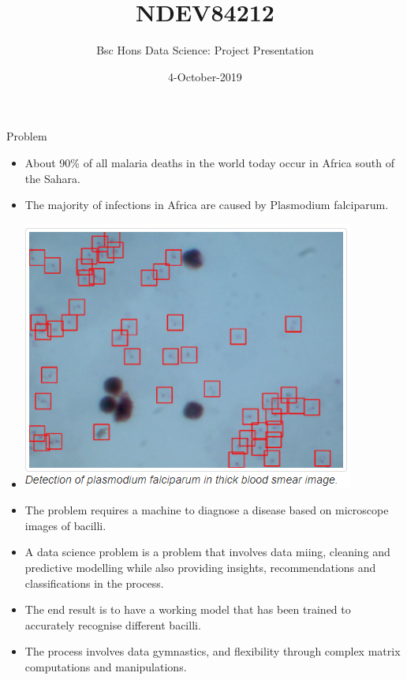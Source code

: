 \documentclass{beamer}
\title[Project Presentation]{NDEV84212}
\author[Olatomiwa Akinlaja]{Bsc Hons Data Science: Project Presentation}
\institute[SPU]{\textbf{\large Olatomiwa O. Akinlaja}}
\date{4-October-2019}
\begin{document}
\frame{\titlepage}
\begin{frame}[t]{Problem}
\vspace{1pt}\small

	\begin{itemize}
	\item About 90\% of all malaria deaths in the world today occur in Africa south of the Sahara.
	\item The majority of infections in Africa are caused by Plasmodium falciparum. 
	\item \includegraphics[scale = 0.5]{DP.png} 
	\end{itemize}

	
\end{frame}

\begin{frame}
	\begin{block}{\color{red}{Why is it a data science problem}} \vspace{5pt}\small
		\begin{itemize}
		\item The problem requires a machine to diagnose a disease based on microscope images of bacilli. 
		\item A data science problem is a problem that involves data miing, cleaning and predictive modelling while also providing insights, recommendations and classifications in the process.  
		\end{itemize}
	\end{block}

\begin{block}{\color{red}{Why the solution requires the skills of a data scientist}}\vspace{5pt}\small
	\begin{itemize}
		\item The end result is to have a working model that has been trained to accurately recognise different bacilli.
		
		\item The process involves data gymnastics, and flexibility through complex matrix computations and manipulations.
	\end{itemize}
\end{block}
\end{frame}
\end{document}
